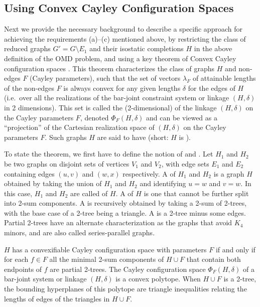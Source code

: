\subsection{Using Convex Cayley Configuration Spaces}
\label{sec:2-tree-reduction}
%
Next we provide the necessary background to describe a specific approach for achieving the requirements (a)--(c) mentioned above, by restricting the class of reduced graphs $G' = G\setminus E_1$ and their isostatic completions $H$ in the above definition of the OMD problem, and using a key theorem of Convex Cayley configuration spaces \cite{sitharam2010convex}. This theorem characterizes the class of graphs $H$ and non-edges $F$ (Cayley parameters), such that the set of vectors $\lambda_F$ of  attainable lengths of the non-edges $F$ is always convex for any given lengths $\delta$ for the edges of $H$ (i.e.\ over all the realizations of the bar-joint constraint system or linkage $(H,\delta)$ in 2 dimensions). This set is called the (2-dimensional)  of the linkage $(H,\delta)$ on the Cayley parameters $F$, denoted $\Phi_F(H,\delta)$ and can be viewed as a ``projection'' of the Cartesian realization space of $(H,\delta)$ on the Cayley parameters $F$. Such graphs $H$ are said to have  (short: $H$ is ).

To state the theorem, we first have to define the notion of  and . Let $H_1$ and $H_2$ be two graphs on disjoint sets of vertices $V_1$ and $V_2$, with edge sets $E_1$ and $E_2$ containing edges $(u,v)$ and $(w,x)$ respectively.
A  of $H_1$ and $H_2$ is a graph $H$ obtained by taking the union of $H_1$ and $H_2$ and identifying $u=w$ and $v=w$. In this case, $H_1$ and $H_2$ are called  of $H$. A  of $H$ is  one that cannot be further split into 2-sum components. A  is recursively obtained by taking a 2-sum of 2-trees, with the base case of a 2-tree being a triangle. A  is a 2-tree minus some edges. Partial 2-trees have an alternate characterization as the graphs that avoid $K_4$ minors, and are also called series-parallel graphs.

\begin{theorem}
\label{theorem:convexcayley}
    \cite{sitharam2010convex} $H$ has a convexifiable Cayley configuration space with parameters $F$ if and only if for each $f\in F$ all the minimal 2-sum components of $H\cup F$ that contain both endpoints of $f$ are partial 2-trees. The Cayley configuration space $\Phi_F(H,\delta)$ of a bar-joint system or linkage $(H,\delta)$ is a convex polytope. When $H\cup F$ is a 2-tree, the bounding hyperplanes of this polytope are triangle inequalities relating the lengths of edges of the triangles in $H\cup F$.
\end{theorem}

